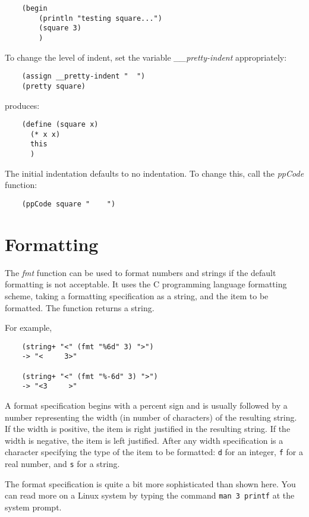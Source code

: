 \begin{verbatim}
    (begin
        (println "testing square...")
        (square 3)
        )
\end{verbatim}

To change the level of indent, set the variable {\it \_\_pretty-indent} 
appropriately:

\begin{verbatim}
    (assign __pretty-indent "  ")
    (pretty square)
\end{verbatim}

produces:

\begin{verbatim}
    (define (square x)
      (* x x)
      this
      )
\end{verbatim}

The initial indentation defaults to no indentation.
To change this, call the {\it ppCode} function:

\begin{verbatim}
    (ppCode square "    ")
\end{verbatim}

\section{Formatting}

The {\it fmt} function can be used to format numbers and strings
if the default formatting is not acceptable. It uses the C
programming language formatting scheme, taking a formatting
specification as a string, and the item to be formatted.
The function returns a string.

For example,

\begin{verbatim}
    (string+ "<" (fmt "%6d" 3) ">")
    -> "<     3>"

    (string+ "<" (fmt "%-6d" 3) ">")
    -> "<3     >"
\end{verbatim}

A format specification begins with a percent sign and is usually followed
by a number representing the width (in number of characters)
of the resulting string. If the width is positive, the
item is right justified in the resulting string. If the width
is negative, the item is left justified.
After any width specification is a character specifying the
type of the item to be formatted:
\verb!d! for an integer,
\verb!f! for a real number, and
\verb!s! for a string.

The format specification is quite a bit more sophisticated
than shown here. You can read more on a Linux system by
typing the command \verb!man 3 printf! at the system prompt.

